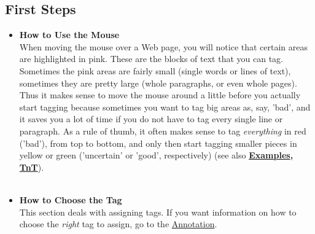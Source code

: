 \documentclass[12pt]{article}
\begin{document}
\subsection{First Steps}

\begin{itemize}
	\item {\large \textbf{How to Use the Mouse}}\\
When moving the mouse over a Web page, you will notice that certain areas are highlighted in pink. These are the blocks of text that you can tag. Sometimes the pink areas are fairly small (single words or lines of text), sometimes they are pretty large (whole paragraphs, or even whole pages). Thus it makes sense to move the mouse around a little before you actually start tagging because sometimes you want to tag big areas as, say, 'bad', and it saves you a lot of time if you do not have to tag every single line or paragraph. As a rule of thumb, it often makes sense to tag \emph{everything} in red ('bad'), from top to bottom, and only then start tagging smaller pieces in yellow or green ('uncertain' or 'good', respectively) (see also \textbf{\hyperref{Examples}{Examples, described on page~}{}{Examples}, \hyperref{Tips \& Tricks}{Tips \& Tricks, page ~}{}{TnT}}).\\ \\


	\item {\large \textbf{How to Choose the Tag}}\\

This section deals with assigning tags. If you want information on how to choose the \emph{right} tag to assign, go to the \hyperref{Annotation Guidlines}{Annotation Guidlines on page ~}{}{Annotation}. \\


\end{itemize}
\end{document}
